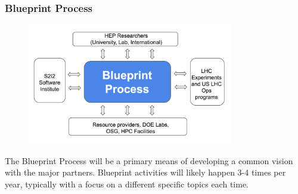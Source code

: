 \begin{frame}
\frametitle{Blueprint Process}

\begin{figure}[htbp]
\begin{center}
\includegraphics[width=0.8\textwidth]{images/s2i2-global-blueprint-activity.png}
\end{center}
\end{figure}

\small{The Blueprint Process will be a primary means of developing a common vision with the major partners. Blueprint activities will likely happen 3-4 times per year, typically with a focus on a different specific topics each time.}

\end{frame}


